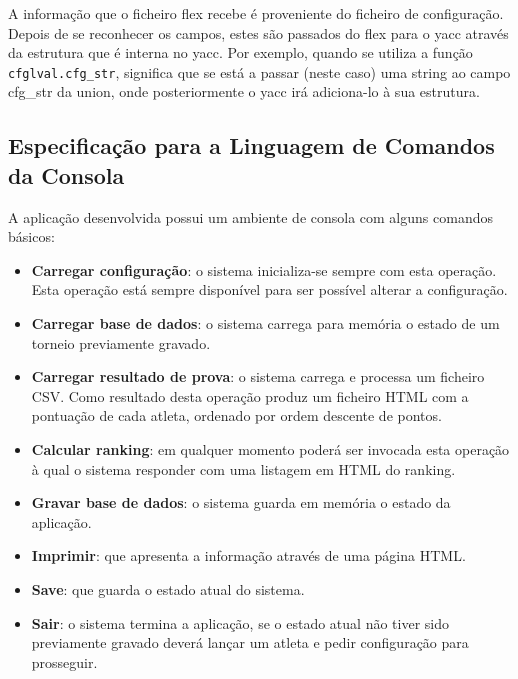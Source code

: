 \documentclass[11pt, a4paper, oneside]{article}
\begin{document}
A informação que o ficheiro \textsf{flex} recebe é proveniente do ficheiro de configuração.
Depois de se reconhecer os campos, estes são passados do \textsf{flex} para o \textsf{yacc} através da estrutura que é interna no \textsf{yacc}.
Por exemplo, quando se utiliza a função \texttt{cfglval.cfg\_str}, significa que se está a passar (neste caso) uma string ao campo cfg\_str da union, onde posteriormente o \textsf{yacc} irá adiciona-lo à sua estrutura.
\newpage

\subsection{Especificação para a Linguagem de Comandos da Consola}
A aplicação desenvolvida possui um ambiente de consola com alguns comandos básicos:
\begin{itemize}
\item \textbf{Carregar configuração}: o sistema inicializa-se sempre com esta operação. Esta operação está sempre disponível para ser possível alterar a configuração.
\item \textbf{Carregar base de dados}: o sistema carrega para memória o estado de um torneio previamente gravado.
\item \textbf{Carregar resultado de prova}: o sistema carrega e processa um ficheiro CSV. Como resultado desta operação produz um ficheiro HTML com a pontuação de cada atleta, ordenado por ordem descente de pontos.
\item \textbf{Calcular ranking}: em qualquer momento poderá ser invocada esta operação à qual o sistema responder com uma listagem em HTML do ranking.
\item \textbf{Gravar base de dados}: o sistema guarda em memória o estado da aplicação.
\item \textbf{Imprimir}: que apresenta a informação através de uma página HTML.
\item \textbf{Save}: que guarda o estado atual do sistema.
\item \textbf{Sair}: o sistema termina a aplicação, se o estado atual não tiver sido previamente gravado deverá lançar um atleta e pedir configuração para prosseguir.
\end{itemize}
\newpage
\end{document}
